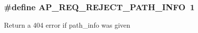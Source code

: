 \subsubsection[{\texorpdfstring{A\+P\+\_\+\+R\+E\+Q\+\_\+\+R\+E\+J\+E\+C\+T\+\_\+\+P\+A\+T\+H\+\_\+\+I\+N\+FO}{AP_REQ_REJECT_PATH_INFO}}]{\setlength{\rightskip}{0pt plus 5cm}\#define A\+P\+\_\+\+R\+E\+Q\+\_\+\+R\+E\+J\+E\+C\+T\+\_\+\+P\+A\+T\+H\+\_\+\+I\+N\+FO~1}\hypertarget{group__values__request__rec__used__path__info_ga671b854d16c687f92e4e6be0db74cf08}{}\label{group__values__request__rec__used__path__info_ga671b854d16c687f92e4e6be0db74cf08}
Return a 404 error if path\+\_\+info was given 